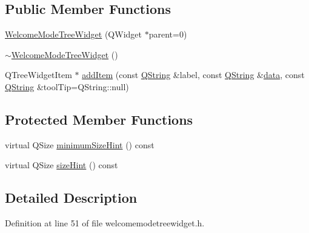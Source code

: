 \subsection*{Public Member Functions}
\begin{DoxyCompactItemize}
\item 
\hyperlink{class_utils_1_1_welcome_mode_tree_widget_aa3be7e2a277edb1a7016cdf847d04dc8}{Welcome\-Mode\-Tree\-Widget} (Q\-Widget $\ast$parent=0)
\item 
\hyperlink{class_utils_1_1_welcome_mode_tree_widget_add305bb794493c55381197534fe2b5dc}{$\sim$\-Welcome\-Mode\-Tree\-Widget} ()
\item 
Q\-Tree\-Widget\-Item $\ast$ \hyperlink{class_utils_1_1_welcome_mode_tree_widget_a00975ed0f3a6b41f6b976da61820f240}{add\-Item} (const \hyperlink{group___u_a_v_objects_plugin_gab9d252f49c333c94a72f97ce3105a32d}{Q\-String} \&label, const \hyperlink{group___u_a_v_objects_plugin_gab9d252f49c333c94a72f97ce3105a32d}{Q\-String} \&\hyperlink{glext_8h_a8850df0785e6fbcc2351af3b686b8c7a}{data}, const \hyperlink{group___u_a_v_objects_plugin_gab9d252f49c333c94a72f97ce3105a32d}{Q\-String} \&tool\-Tip=Q\-String\-::null)
\end{DoxyCompactItemize}
\subsection*{Protected Member Functions}
\begin{DoxyCompactItemize}
\item 
virtual Q\-Size \hyperlink{class_utils_1_1_welcome_mode_tree_widget_a05db1c42d172d2e045cce69291c279e4}{minimum\-Size\-Hint} () const 
\item 
virtual Q\-Size \hyperlink{class_utils_1_1_welcome_mode_tree_widget_ac7921ebee3d7a837694bda6147d922e9}{size\-Hint} () const 
\end{DoxyCompactItemize}


\subsection{Detailed Description}


Definition at line 51 of file welcomemodetreewidget.\-h.



